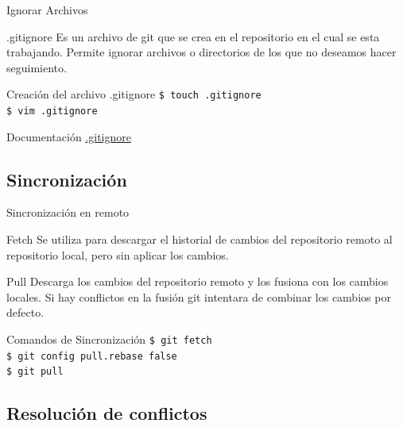 \documentclass{beamer}
\begin{document}
\begin{frame} {Ignorar Archivos}

  \begin{alertblock}{.gitignore}
    Es un archivo de git que se crea en el repositorio en el cual se esta trabajando.
    Permite ignorar archivos o directorios de los que no deseamos hacer seguimiento.
  \end{alertblock}


    \begin{block}{Creación del archivo .gitignore}
      {\texttt{\$ touch .gitignore }} \\ 
      {\texttt{\$ vim .gitignore }}
    \end{block}

    {Documentación \href{https://docs.github.com/es/get-started/getting-started-with-git/ignoring-files}{.gitignore}}

\end{frame}

\subsection {Sincronización}
  \begin{frame} {\LARGE Sincronización en remoto}
  
      \begin{exampleblock}{Fetch}
        Se utiliza para descargar el historial de cambios del repositorio remoto al repositorio local, pero sin aplicar los cambios.
      \end{exampleblock}
        
      \begin{exampleblock}{Pull}
        Descarga los cambios del repositorio remoto y los fusiona con los cambios locales.
        Si hay conflictos en la fusión git intentara de combinar los cambios por defecto. 
      \end{exampleblock}


      \begin{block}{Comandos de Sincronización}
        {\texttt{\$ git fetch }}  \\
        {\texttt{\$ git config pull.rebase false  }}  \\
        {\texttt{\$ git pull  }}  \\
      \end{block}
    
  \end{frame}

\subsection {Resolución de conflictos} 
\end{document}
